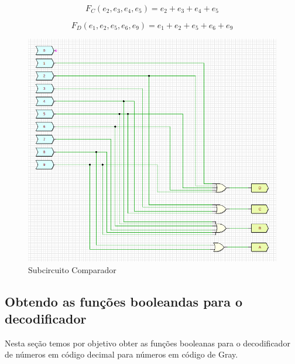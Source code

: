 \documentclass[12pt]{article}
\begin{document}
\begin{equation}
F_{C}(e_{2},e_{3},e_{4},e_{5}) = e_{2}+e_{3}+e_{4}+e_{5}
\end{equation}

\begin{equation}
F_{D}(e_{1},e_{2},e_{5},e_{6},e_{9}) = e_{1}+e_{2}+e_{5}+e_{6}+e_{9}
\end{equation}

\begin{figure}[htp]
    \centering
    \includegraphics[width=12cm]{Exp05/2.1.png}
    \caption{Subcircuito Comparador}
    \label{fig:galaxy}
\end{figure}


\subsection{Obtendo as funções booleandas para o decodificador}\label{sec:boolean_functions_decoder}

Nesta seção temos por objetivo obter as funções booleanas para o decodificador
de números em código decimal para números em código de Gray.
\end{document}
